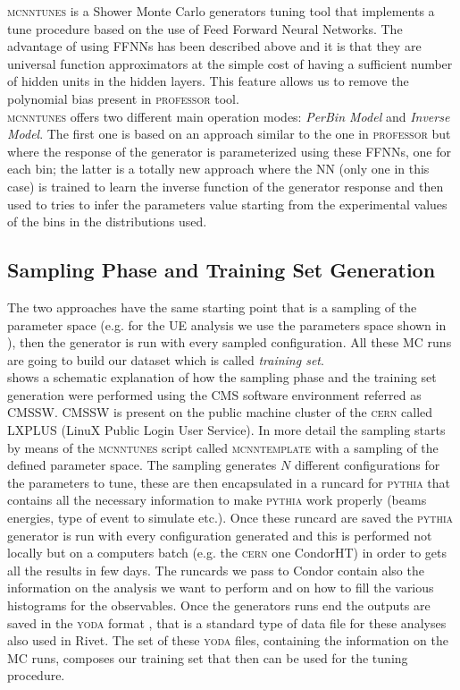\textsc{mcnntunes} \cite{MCNNTUNESarticle} is a Shower Monte Carlo generators tuning tool that implements a tune procedure based on the use of Feed Forward Neural Networks. The advantage of using FFNNs has been described above and it is that they are universal function approximators at the simple cost of having a sufficient number of hidden units in the hidden layers. This feature allows us to remove the polynomial bias present in \textsc{professor} tool.
\\
\textsc{mcnntunes} offers two different main operation modes: \textit{PerBin Model} and \textit{Inverse Model}. The first one is based on an approach similar to the one in \textsc{professor} but where the response of the generator is parameterized using these FFNNs, one for each bin; the latter is a totally new approach where the NN (only one in this case) is trained to learn the inverse function of the generator response and then used to tries to infer the parameters value starting from the experimental values of the bins in the distributions used.
\\

\medskip

\subsection{Sampling Phase and Training Set Generation}

The two approaches have the same starting point that is a sampling of the parameter space (e.g. for the UE analysis we use the parameters space shown in ), then the generator is run with every sampled configuration. 
All these MC runs are going to build our dataset which is called \textit{training set}.
\\
 shows a schematic explanation of how the sampling phase and the training set generation were performed using the CMS software environment referred as CMSSW. CMSSW is present on the public machine cluster of the \textsc{cern} called LXPLUS (LinuX Public Login User Service). 
In more detail the sampling starts by means of the  \textsc{mcnntunes} script called \textsc{mcnntemplate} with a sampling of the defined parameter space. The sampling generates  $N$ different configurations for the parameters to tune, these are then encapsulated in a runcard for \textsc{pythia} that contains all the necessary information to make \textsc{pythia} work properly (beams energies, type of event to simulate etc.). Once these runcard are saved the \textsc{pythia} generator is run with every configuration generated and this is performed not locally but on a computers batch (e.g. the \textsc{cern} one CondorHT) in order to gets all the results in few days. The runcards we pass to Condor contain also the information on the analysis we want to perform and on how to fill the various histograms for the observables. Once the generators runs end the outputs are saved in the \textsc{yoda} format \cite{YODA}, that is a standard type of data file for these analyses also used in Rivet. The set of these \textsc{yoda} files, containing the information on the MC runs, composes our training set that then can be used for the tuning procedure.

